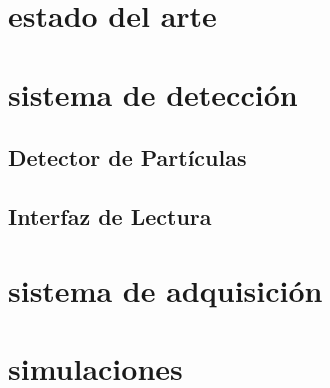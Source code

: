 \documentclass[11pt,letterpaper,oneside]{phstylee}
\begin{document}
\newpage
\thispagestyle{empty}
\cleardoublepage
%
%

\chapter{estado del arte}
\label{cap:art}


\newpage
\thispagestyle{empty}
\cleardoublepage

\chapter{sistema de detección}
\label{cap:sdet}


	\section{Detector de Partículas}
	\label{sec:stgc}
	
	
	\section{Interfaz de Lectura}
	\label{sec:asd}
	

\newpage
\thispagestyle{empty}
\cleardoublepage

\chapter{sistema de adquisición}
\label{cap:sadq}
%

\newpage
\thispagestyle{empty}
\cleardoublepage

\chapter{simulaciones}
\label{cap:sim}
%

\newpage
\thispagestyle{empty}
\cleardoublepage

%
\end{document}
